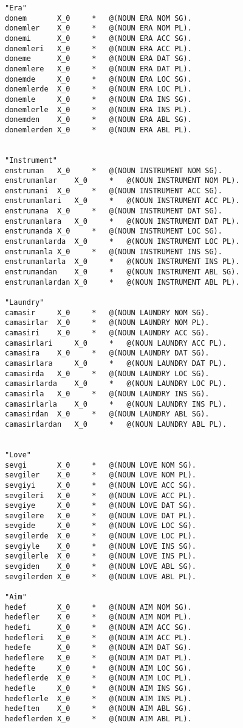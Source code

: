 \begin{lstlisting}
"Era"
donem		X_0 	* 	@(NOUN ERA NOM SG).
donemler	X_0 	* 	@(NOUN ERA NOM PL).
donemi		X_0 	* 	@(NOUN ERA ACC SG).
donemleri 	X_0 	* 	@(NOUN ERA ACC PL).
doneme	 	X_0 	* 	@(NOUN ERA DAT SG).
donemlere 	X_0 	* 	@(NOUN ERA DAT PL).
donemde		X_0 	* 	@(NOUN ERA LOC SG).
donemlerde	X_0 	* 	@(NOUN ERA LOC PL).
donemle		X_0 	* 	@(NOUN ERA INS SG).
donemlerle	X_0 	* 	@(NOUN ERA INS PL).
donemden	X_0 	* 	@(NOUN ERA ABL SG).
donemlerden	X_0 	* 	@(NOUN ERA ABL PL).


"Instrument"
enstruman	X_0 	* 	@(NOUN INSTRUMENT NOM SG).
enstrumanlar	X_0 	* 	@(NOUN INSTRUMENT NOM PL).
enstrumani	X_0 	* 	@(NOUN INSTRUMENT ACC SG).
enstrumanlari 	X_0 	* 	@(NOUN INSTRUMENT ACC PL).
enstrumana	X_0 	* 	@(NOUN INSTRUMENT DAT SG).
enstrumanlara 	X_0 	* 	@(NOUN INSTRUMENT DAT PL).
enstrumanda	X_0 	* 	@(NOUN INSTRUMENT LOC SG).
enstrumanlarda	X_0 	* 	@(NOUN INSTRUMENT LOC PL).
enstrumanla	X_0 	* 	@(NOUN INSTRUMENT INS SG).
enstrumanlarla	X_0 	* 	@(NOUN INSTRUMENT INS PL).
enstrumandan	X_0 	* 	@(NOUN INSTRUMENT ABL SG).
enstrumanlardan	X_0 	* 	@(NOUN INSTRUMENT ABL PL).

"Laundry"
camasir		X_0 	* 	@(NOUN LAUNDRY NOM SG).
camasirlar	X_0 	* 	@(NOUN LAUNDRY NOM PL).
camasiri	X_0 	* 	@(NOUN LAUNDRY ACC SG).
camasirlari 	X_0 	* 	@(NOUN LAUNDRY ACC PL).
camasira	X_0 	* 	@(NOUN LAUNDRY DAT SG).
camasirlara 	X_0 	* 	@(NOUN LAUNDRY DAT PL).
camasirda	X_0 	* 	@(NOUN LAUNDRY LOC SG).
camasirlarda	X_0 	* 	@(NOUN LAUNDRY LOC PL).
camasirla	X_0 	* 	@(NOUN LAUNDRY INS SG).
camasirlarla	X_0 	* 	@(NOUN LAUNDRY INS PL).
camasirdan	X_0 	* 	@(NOUN LAUNDRY ABL SG).
camasirlardan	X_0 	* 	@(NOUN LAUNDRY ABL PL).


"Love"
sevgi		X_0 	* 	@(NOUN LOVE NOM SG).
sevgiler	X_0 	* 	@(NOUN LOVE NOM PL).
sevgiyi		X_0 	* 	@(NOUN LOVE ACC SG).
sevgileri 	X_0 	* 	@(NOUN LOVE ACC PL).
sevgiye		X_0 	* 	@(NOUN LOVE DAT SG).
sevgilere 	X_0 	* 	@(NOUN LOVE DAT PL).
sevgide		X_0 	* 	@(NOUN LOVE LOC SG).
sevgilerde	X_0 	* 	@(NOUN LOVE LOC PL).
sevgiyle	X_0 	* 	@(NOUN LOVE INS SG).
sevgilerle	X_0 	* 	@(NOUN LOVE INS PL).
sevgiden	X_0 	* 	@(NOUN LOVE ABL SG).
sevgilerden	X_0 	* 	@(NOUN LOVE ABL PL).

"Aim"
hedef		X_0 	* 	@(NOUN AIM NOM SG).
hedefler	X_0 	* 	@(NOUN AIM NOM PL).
hedefi		X_0 	* 	@(NOUN AIM ACC SG).
hedefleri 	X_0 	* 	@(NOUN AIM ACC PL).
hedefe		X_0 	* 	@(NOUN AIM DAT SG).
hedeflere 	X_0 	* 	@(NOUN AIM DAT PL).
hedefte		X_0 	* 	@(NOUN AIM LOC SG).
hedeflerde	X_0 	* 	@(NOUN AIM LOC PL).
hedefle		X_0 	* 	@(NOUN AIM INS SG).
hedeflerle	X_0 	* 	@(NOUN AIM INS PL).
hedeften	X_0 	* 	@(NOUN AIM ABL SG).
hedeflerden	X_0 	* 	@(NOUN AIM ABL PL).


\end{lstlisting}
